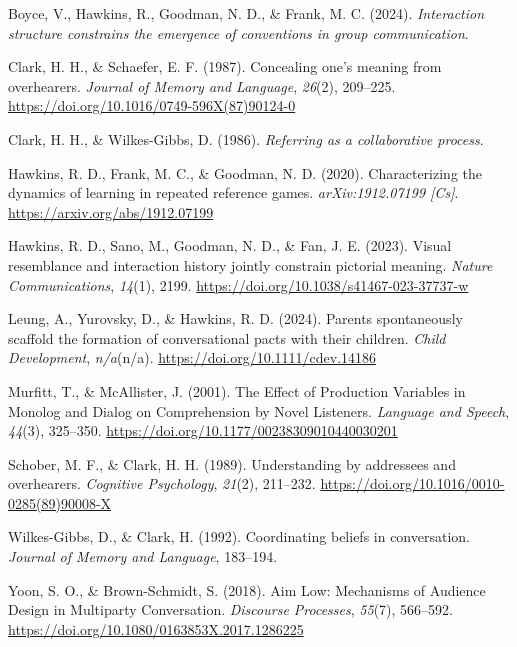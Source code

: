 \documentclass[10pt, letterpaper]{article}
\begin{document}
\label{refs}
\begin{CSLReferences}{1}{0}
Boyce, V., Hawkins, R., Goodman, N. D., \& Frank, M. C. (2024).
\emph{Interaction structure constrains the emergence of conventions in
group communication}.

Clark, H. H., \& Schaefer, E. F. (1987). Concealing one's meaning from
overhearers. \emph{Journal of Memory and Language}, \emph{26}(2),
209--225. \url{https://doi.org/10.1016/0749-596X(87)90124-0}

Clark, H. H., \& Wilkes-Gibbs, D. (1986). \emph{Referring as a
collaborative process}.

Hawkins, R. D., Frank, M. C., \& Goodman, N. D. (2020). Characterizing
the dynamics of learning in repeated reference games.
\emph{arXiv:1912.07199 {[}Cs{]}}. \url{https://arxiv.org/abs/1912.07199}

Hawkins, R. D., Sano, M., Goodman, N. D., \& Fan, J. E. (2023). Visual
resemblance and interaction history jointly constrain pictorial meaning.
\emph{Nature Communications}, \emph{14}(1), 2199.
\url{https://doi.org/10.1038/s41467-023-37737-w}

Leung, A., Yurovsky, D., \& Hawkins, R. D. (2024). Parents spontaneously
scaffold the formation of conversational pacts with their children.
\emph{Child Development}, \emph{n/a}(n/a).
\url{https://doi.org/10.1111/cdev.14186}

Murfitt, T., \& McAllister, J. (2001). The {Effect} of {Production
Variables} in {Monolog} and {Dialog} on {Comprehension} by {Novel
Listeners}. \emph{Language and Speech}, \emph{44}(3), 325--350.
\url{https://doi.org/10.1177/00238309010440030201}

Schober, M. F., \& Clark, H. H. (1989). Understanding by addressees and
overhearers. \emph{Cognitive Psychology}, \emph{21}(2), 211--232.
\url{https://doi.org/10.1016/0010-0285(89)90008-X}

Wilkes-Gibbs, D., \& Clark, H. (1992). Coordinating beliefs in
conversation. \emph{Journal of Memory and Language}, 183--194.

Yoon, S. O., \& Brown-Schmidt, S. (2018). Aim {Low}: {Mechanisms} of
{Audience Design} in {Multiparty Conversation}. \emph{Discourse
Processes}, \emph{55}(7), 566--592.
\url{https://doi.org/10.1080/0163853X.2017.1286225}

\end{CSLReferences}


\end{document}
